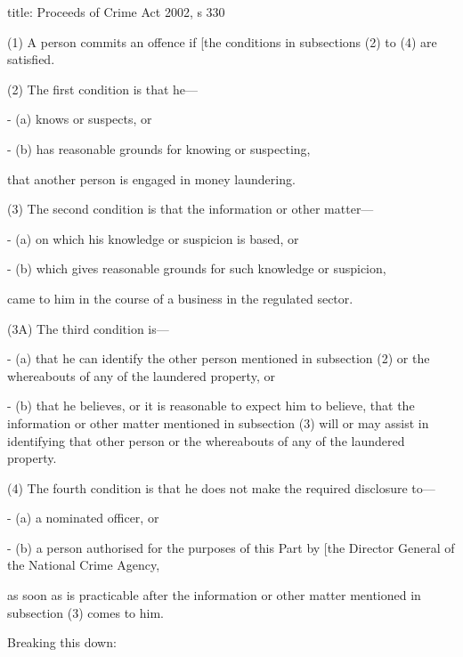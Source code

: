 \documentclass[
]{article}
\newenvironment{Shaded}{}{}
\newcommand{\NormalTok}[1]{#1}
\begin{document}
\begin{Shaded}
\begin{Highlighting}[]
\NormalTok{title: Proceeds of Crime Act 2002, s 330}

\NormalTok{(1) A person commits an offence if [the conditions in subsections (2) to (4) are satisfied.}

\NormalTok{(2) The first condition is that he—}

\NormalTok{{-} (a) knows or suspects, or}

\NormalTok{{-} (b) has reasonable grounds for knowing or suspecting,}

\NormalTok{that another person is engaged in money laundering.}

\NormalTok{(3) The second condition is that the information or other matter—}

\NormalTok{{-} (a) on which his knowledge or suspicion is based, or}

\NormalTok{{-} (b) which gives reasonable grounds for such knowledge or suspicion,}

\NormalTok{came to him in the course of a business in the regulated sector.}

\NormalTok{(3A) The third condition is—}

\NormalTok{{-} (a) that he can identify the other person mentioned in subsection (2) or the whereabouts of any of the laundered property, or}

\NormalTok{{-} (b) that he believes, or it is reasonable to expect him to believe, that the information or other matter mentioned in subsection (3) will or may assist in identifying that other person or the whereabouts of any of the laundered property.}

\NormalTok{(4) The fourth condition is that he does not make the required disclosure to—}

\NormalTok{{-} (a) a nominated officer, or}

\NormalTok{{-} (b) a person authorised for the purposes of this Part by [the Director General of the National Crime Agency,}

\NormalTok{as soon as is practicable after the information or other matter mentioned in subsection (3) comes to him.}
\end{Highlighting}
\end{Shaded}

Breaking this down:
\end{document}
